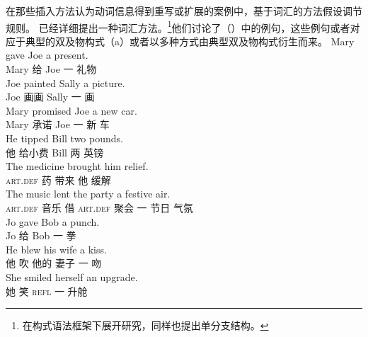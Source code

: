     在那些插入方法认为动词信息得到重写或扩展的案例中，基于词汇的方法假设调节规则。 \citet[\S~4]{BC99a}已经详细提出一种词汇方法。\footnote{\citet{Kay2005a}在构式语法框架下展开研究，同样也提出单分支结构。}他们讨论了（）中的例句，这些例句或者对应于典型的双及物构式（a）或者以多种方式由典型双及物构式衍生而来。
\eal
\ex 
\gll Mary gave Joe a present.\\
Mary 给 Joe 一 礼物\\
\ex\label{paint} 
\gll Joe painted Sally a picture.\\
Joe 画画 Sally 一 画\\
\ex 
\gll Mary promised Joe a new car.\\
Mary 承诺 Joe 一 新 车\\
\ex 
\gll He tipped Bill two pounds.\\
他 给小费 Bill 两 英镑\\
\ex 
\gll The medicine brought him relief.\\
\textsc{art}.\textsc{def} 药 带来 他 缓解\\
\ex 
\gll The music lent the party a festive air.\\
\textsc{art}.\textsc{def} 音乐 借 \textsc{art}.\textsc{def} 聚会 一 节日 气氛\\
\ex 
\gll Jo gave Bob a punch.\\
Jo 给 Bob 一 拳\\
\ex 
\gll He blew his wife a kiss.\\
他 吹 他的 妻子 一 吻\\
\ex\label{ex-smiled-herself-an-upgrade} 
\gll She smiled herself an upgrade.\\
她 笑  \textsc{refl} 一 升舱\\
